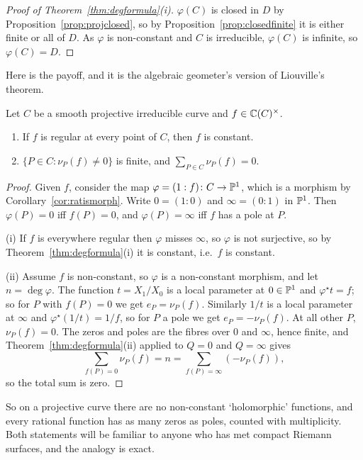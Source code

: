 \documentclass[a4paper]{scrartcl}
\begin{document}
\begin{proof}[Proof of Theorem~\ref{thm:degformula}(i)]
	$\varphi(C)$ is closed in $D$ by Proposition~\ref{prop:projclosed}, so by Proposition~\ref{prop:closedfinite} it is either finite or all of $D$. As $\varphi$ is non-constant and $C$ is irreducible, $\varphi(C)$ is infinite, so $\varphi(C) = D$.
\end{proof}

Here is the payoff, and it is the algebraic geometer's version of Liouville's theorem.

\begin{corollary}\label{cor:liouville}
	Let $C$ be a smooth projective irreducible curve and $f \in \mathbb{C}(C)^\times$.
	\begin{enumerate}[label=(\roman*)]
		\item If $f$ is regular at every point of $C$, then $f$ is constant.
		\item $\{P \in C : \nu_P(f)\neq 0\}$ is finite, and $\displaystyle\sum_{P\in C}\nu_P(f) = 0$.
	\end{enumerate}
\end{corollary}

\begin{proof}
	Given $f$, consider the map $\varphi = (1 : f) \colon C \to \mathbb{P}^1$, which is a morphism by Corollary~\ref{cor:ratismorph}. Write $0 = (1:0)$ and $\infty = (0:1)$ in $\mathbb{P}^1$. Then $\varphi(P) = 0$ iff $f(P) = 0$, and $\varphi(P) = \infty$ iff $f$ has a pole at $P$.

	(i) If $f$ is everywhere regular then $\varphi$ misses $\infty$, so $\varphi$ is not surjective, so by Theorem~\ref{thm:degformula}(i) it is constant, i.e.\ $f$ is constant.

	(ii) Assume $f$ is non-constant, so $\varphi$ is a non-constant morphism, and let $n = \deg\varphi$. The function $t = X_1/X_0$ is a local parameter at $0 \in \mathbb{P}^1$ and $\varphi^\star t = f$; so for $P$ with $f(P) = 0$ we get $e_P = \nu_P(f)$. Similarly $1/t$ is a local parameter at $\infty$ and $\varphi^\star(1/t) = 1/f$, so for $P$ a pole we get $e_P = -\nu_P(f)$. At all other $P$, $\nu_P(f) = 0$. The zeros and poles are the fibres over $0$ and $\infty$, hence finite, and Theorem~\ref{thm:degformula}(ii) applied to $Q = 0$ and $Q = \infty$ gives
	$$\sum_{f(P) = 0}\nu_P(f) = n = \sum_{f(P) = \infty}(-\nu_P(f)),$$
	so the total sum is zero.
\end{proof}

So on a projective curve there are no non-constant `holomorphic' functions, and every rational function has as many zeros as poles, counted with multiplicity. Both statements will be familiar to anyone who has met compact Riemann surfaces, and the analogy is exact.
\end{document}
